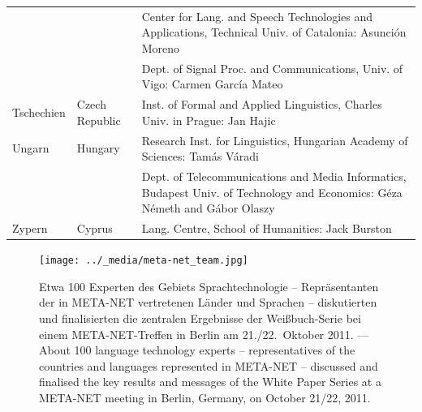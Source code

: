 \documentclass[]{../../metanetpaper}
\begin{document}
\begin{longtable}{llp{105mm}}
  & & Center for Lang. and Speech Technologies and Applications, Technical Univ. of Catalonia: Asunción Moreno \\ \addlinespace 
  & & Dept. of Signal Proc. and Communications, Univ. of Vigo: Carmen García Mateo \\ \addlinespace 
  Tschechien & \textcolor{grey1}{Czech Republic} & Inst. of Formal and Applied Linguistics, Charles Univ. in Prague: Jan Hajic \\ \addlinespace
  Ungarn & \textcolor{grey1}{Hungary} & Research Inst. for Linguistics, Hungarian Academy of Sciences: Tamás Váradi\\  \addlinespace
  & & Dept. of Telecommunications and Media Informatics, Budapest Univ. of Technology and Economics: Géza Németh and Gábor Olaszy\\ \addlinespace
  Zypern & \textcolor{grey1}{Cyprus} & Lang. Centre, School of Humanities: Jack Burston
\end{longtable}
\normalsize

\renewcommand*{\figureformat}{}
\renewcommand*{\captionformat}{}

\begin{figure}[htbp]
  \center
  \texttt{[image: ../\_media/meta-net\_team.jpg]}
  \caption{Etwa 100 Experten des Gebiets Sprachtechnologie -- Repräsentanten der in META-NET vertretenen Länder und Sprachen -- diskutierten und finalisierten die zentralen Ergebnisse der Weißbuch-Serie bei einem META-NET-Treffen in Berlin am 21./22.~Oktober 2011. --- \textcolor{grey1}{About 100 language technology experts -- representatives of the countries and languages represented in META-NET -- discussed and finalised the key results and messages of the White Paper Series at a META-NET meeting in Berlin, Germany, on October 21/22, 2011.}}
\end{figure}

\cleardoublepage

\label{whitepaperseries}
\end{document}
